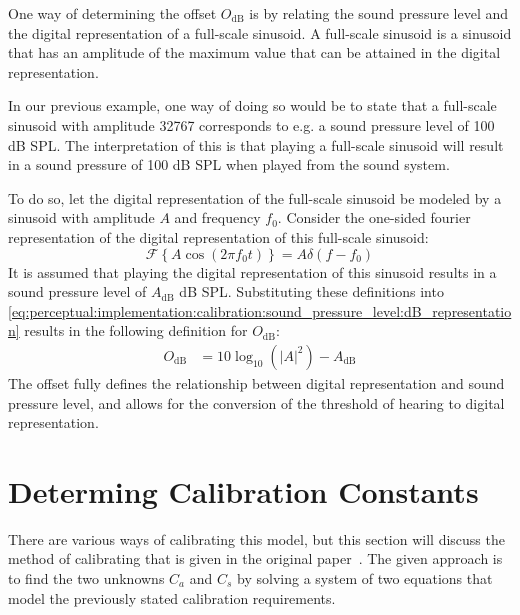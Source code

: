 One way of determining the offset $O_\text{dB}$ is by relating the sound pressure level and the digital representation of a full-scale sinusoid.
A full-scale sinusoid is a sinusoid that has an amplitude of the maximum value that can be attained in the digital representation.

In our previous example, one way of doing so would be to state that a full-scale sinusoid with amplitude 32767 corresponds to 
e.g. a sound pressure level of 100 dB SPL.
The interpretation of this is that playing a full-scale sinusoid will result in a sound pressure of 100 dB SPL when played from the sound system.

To do so, let the digital representation of the full-scale sinusoid be modeled by a sinusoid with amplitude $A$ and frequency $f_0$.
Consider the one-sided fourier representation of the digital representation of this full-scale sinusoid: 
\begin{equation}
    \mathcal{F}\left\{A\cos\left(2\pi f_0 t\right)\right\} = A\delta\left(f - f_0\right)
\end{equation}
It is assumed that playing the digital representation of this sinusoid results in a sound pressure level of $A_\text{dB}$ dB SPL. 
Substituting these definitions into \autoref{eq:perceptual:implementation:calibration:sound_pressure_level:dB_representation} 
results in the following definition for $O_\text{dB}$: 
\begin{align}
    O_\text{dB} &= 10\log_{10}\left(\left|A\right|^2\right) - A_\text{dB} 
\end{align}
The offset fully defines the relationship between digital representation and sound pressure level, and allows for the conversion of the threshold of hearing
to digital representation.

\section{Determing Calibration Constants}
\label{ch:perceptual:implementation:calibration:coefficients}
There are various ways of calibrating this model, but this section will discuss the method of calibrating 
that is given in the original paper~\cite{van2005perceptual}.
The given approach is to find the two unknowns $C_a$ and $C_s$ by solving a system of two equations that model the previously stated calibration requirements.

